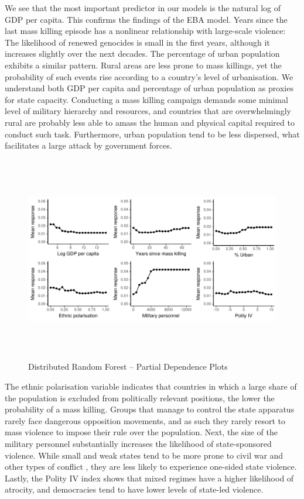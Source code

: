 We see that the most important predictor in our models is the natural log of GDP per capita. This confirms the findings of the EBA model. Years since the last mass killing episode has a nonlinear relationship with large-scale violence: The likelihood of renewed genocides is small in the first years, although it increases slightly over the next decades. The percentage of urban population exhibits a similar pattern. Rural areas are less prone to mass killings, yet the probability of such events rise according to a country’s level of urbanisation. We understand both GDP per capita and percentage of urban population as proxies for state capacity. Conducting a mass killing campaign demands some minimal level of military hierarchy and resources, and countries that are overwhelmingly rural are probably less able to amass the human and physical capital required to conduct such task. Furthermore, urban population tend to be less dispersed, what facilitates a large attack by government forces. 

\vspace{.5cm}

\begin{figure}[h!]
\begin{center}
\includegraphics[width=\textwidth, height=9cm]{images/drfdpp.pdf}
\caption{Distributed Random Forest -- Partial Dependence Plots}
\label{fig:drfdpp}
\end{center}
\end{figure}

The ethnic polarisation variable indicates that countries in which a large share of the population is excluded from politically relevant positions, the lower the probability of a mass killing. Groups that manage to control the state apparatus rarely face dangerous opposition movements, and as such they rarely resort to mass violence to impose their rule over the population. Next, the size of the military personnel substantially increases the likelihood of state-sponsored violence. While small and weak states tend to be more prone to civil war and other types of conflict \citep{collier2004greed,fearon2003ethnicity}, they are less likely to experience one-sided state violence. Lastly, the Polity IV index shows that mixed regimes have a higher likelihood of atrocity, and democracies tend to have lower levels of state-led violence.

